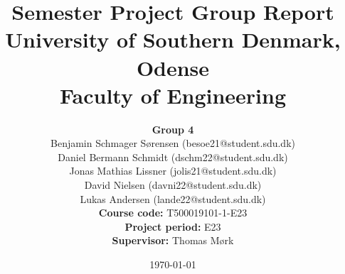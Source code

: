\title{\textbf{
             Semester Project Group Report}\vspace*{0.5em} \\
      University of Southern Denmark, Odense \vspace*{0.5em}\\
     Faculty of Engineering}
\date{\today\vspace*{16em}}
\maketitle
\begin{center}
    \author{\large \textbf{Group 4}\\\vspace*{3mm}
        \vspace*{3mm}
        \large Benjamin Schmager Sørensen (besoe21@student.sdu.dk)\\
        \vspace*{3mm}
        \large Daniel Bermann Schmidt (dschm22@student.sdu.dk)\\
        \vspace*{3mm}
        \large Jonas Mathias Lissner (jolis21@student.sdu.dk)\\
        \vspace*{3mm}
        \large David Nielsen (davni22@student.sdu.dk)\\
        \vspace*{3mm}
        \large  Lukas Andersen (lande22@student.sdu.dk)\\
        \vspace*{3mm}\vspace*{3em}
        \large \textbf{Course code:} T500019101-1-E23\vspace*{1em}\\
        \large \textbf{Project period:} E23\vspace*{1em}\\
        \large \textbf{Supervisor:} Thomas Mørk\vspace*{1em}\\
    }
\end{center}

\maketitle

\thispagestyle{empty}
\clearpage
{}